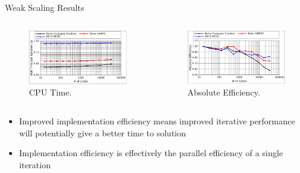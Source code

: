 \documentclass{beamer}
\begin{document}
\begin{frame}{Weak Scaling Results}

  \begin{columns}
    \begin{column}{0.5\textwidth}

      \begin{figure}[htpb!]
        \begin{center}
          \includegraphics[width=2.4in]{titan_pure_weak_time.pdf}
        \end{center}
        \caption{CPU Time.}
      \end{figure}


    \end{column}

    \begin{column}{0.5\textwidth}

    \begin{figure}[htpb!]
      \begin{center}
        \includegraphics[width=2.4in]{titan_weak_absolute.pdf}
      \end{center}
      \caption{Absolute Efficiency.}
    \end{figure}

    \end{column}
  \end{columns}

  \begin{itemize}
  \item Improved implementation efficiency means improved
    iterative performance will potentially give a better time to
    solution
    \bigskip
  \item Implementation efficiency is effectively the parallel
    efficiency of a single iteration
  \end{itemize}


\end{frame}
\end{document}

